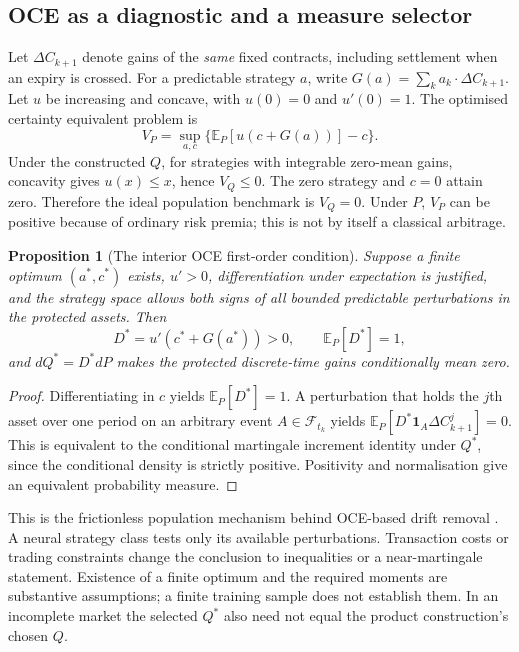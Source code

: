 \documentclass[11pt,a4paper]{article}
\numberwithin{equation}{section}
\newtheorem{proposition}[theorem]{Proposition}
\theoremstyle{definition}\newtheorem{definition}[theorem]{Definition}
\theoremstyle{remark}\newtheorem{remark}[theorem]{Remark}
\newcommand{\E}{\mathbb E}\newcommand{\R}{\mathbb R}
\newcommand{\F}{\mathcal F}\newcommand{\G}{\mathcal G}
\newcommand{\ind}{\mathbf 1}\newcommand{\diag}{\operatorname{diag}}
\begin{document}
\subsection{OCE as a diagnostic and a measure selector}
Let $\Delta C_{k+1}$ denote gains of the \emph{same} fixed contracts, including settlement when an expiry is crossed. For a predictable strategy $a$, write $G(a)=\sum_ka_k\cdot\Delta C_{k+1}$. Let $u$ be increasing and concave, with $u(0)=0$ and $u'(0)=1$. The optimised certainty equivalent problem is
\begin{equation}
 V_P=\sup_{a,c}\{\E_P[u(c+G(a))]-c\}.
 \label{eq:oce}
\end{equation}
Under the constructed $Q$, for strategies with integrable zero-mean gains, concavity gives $u(x)\leq x$, hence $V_Q\leq0$. The zero strategy and $c=0$ attain zero. Therefore the ideal population benchmark is $V_Q=0$. Under $P$, $V_P$ can be positive because of ordinary risk premia; this is not by itself a classical arbitrage.

\begin{proposition}[The interior OCE first-order condition]
\label{prop:oce}
Suppose a finite optimum $(a^*,c^*)$ exists, $u'>0$, differentiation under expectation is justified, and the strategy space allows both signs of all bounded predictable perturbations in the protected assets. Then
\begin{equation}
 D^*=u'(c^*+G(a^*))>0,\qquad \E_P[D^*]=1,
 \label{eq:oce-density}
\end{equation}
and $dQ^*=D^*dP$ makes the protected discrete-time gains conditionally mean zero.
\end{proposition}
\begin{proof}
Differentiating in $c$ yields $\E_P[D^*]=1$. A perturbation that holds the $j$th asset over one period on an arbitrary event $A\in\F_{t_k}$ yields
$\E_P[D^*\ind_A\Delta C^j_{k+1}]=0$. This is equivalent to the conditional martingale increment identity under $Q^*$, since the conditional density is strictly positive. Positivity and normalisation give an equivalent probability measure.
\end{proof}
This is the frictionless population mechanism behind OCE-based drift removal \cite{OCE}. A neural strategy class tests only its available perturbations. Transaction costs or trading constraints change the conclusion to inequalities or a near-martingale statement. Existence of a finite optimum and the required moments are substantive assumptions; a finite training sample does not establish them. In an incomplete market the selected $Q^*$ also need not equal the product construction's chosen $Q$.
\end{document}
